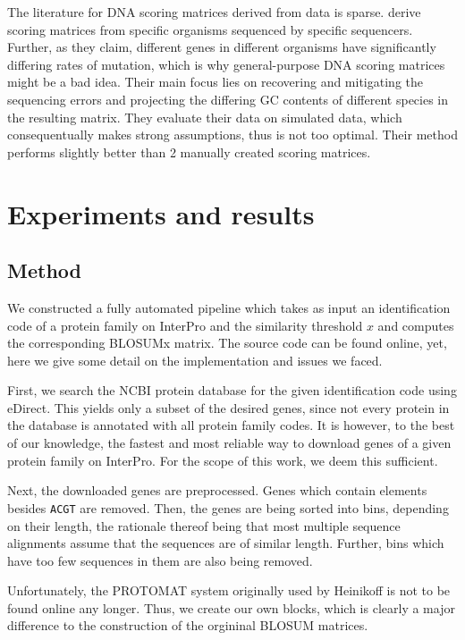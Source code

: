 \documentclass{article}
\begin{document}
\begin{multicols}{2}
The literature for DNA scoring matrices derived from data is sparse.
\textcite{hamadaTrainingAlignmentParameters2017} derive scoring matrices from
specific organisms sequenced by specific sequencers. Further, as they claim,
different genes in different organisms have significantly differing rates of
mutation, which is why general-purpose DNA scoring matrices might be a bad
idea. Their main focus lies on recovering and mitigating the sequencing errors
and projecting the differing GC contents of different species in the resulting
matrix. They evaluate their data on simulated data, which consequentually makes
strong assumptions, thus is not too optimal. Their method performs slightly
better than 2 manually created scoring matrices.


\section*{Experiments and results}
\subsection*{Method}
We constructed a fully automated pipeline which takes as input an identification code of a protein
family on InterPro and the similarity threshold $x$ and computes the
corresponding BLOSUMx matrix. The source code can be found online, yet, here we
give some detail on the implementation and issues we faced.

First, we search the NCBI protein database for the given identification code
using eDirect. This yields only a subset of the desired genes, since not every
protein in the database is annotated with all protein family codes. It is
however, to the best of our knowledge, the fastest and most reliable way to
download genes of a given protein family on InterPro. For the scope of this
work, we deem this sufficient.

Next, the downloaded genes are preprocessed. Genes which contain elements
besides \texttt{ACGT} are removed. Then, the genes are being sorted into bins,
depending on their length, the rationale thereof being that most multiple
sequence alignments assume that the sequences are of similar length. Further,
bins which have too few sequences in them are also being removed.

Unfortunately, the PROTOMAT system originally used by Heinikoff is not to be
found online any longer. Thus, we create our own blocks, which is clearly a
major difference to the construction of the orgininal BLOSUM matrices.


\end{multicols}
\end{document}
